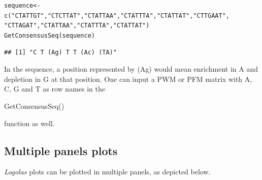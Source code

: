 \documentclass[12pt]{article}\usepackage[]{graphicx}\usepackage[usenames,dvipsnames]{color}
\newcommand{\hlstr}[1]{\textcolor[rgb]{0.251,0.627,0.251}{#1}}%
\newcommand{\hlstd}[1]{\textcolor[rgb]{0.251,0.251,0.251}{#1}}%
\newcommand{\hlkwb}[1]{\textcolor[rgb]{0,0,0}{#1}}%
\newcommand{\hlkwd}[1]{\textcolor[rgb]{0.878,0.439,0.125}{#1}}%
\newenvironment{knitrout}{}{} %
\newcommand{\Logolas}{\textit{Logolas}}
\begin{document}
\begin{knitrout}
\color{fgcolor}\begin{kframe}
\begin{alltt}
\hlstd{sequence} \hlkwb{<-} \hlkwd{c}\hlstd{(}\hlstr{"CTATTGT"}\hlstd{,} \hlstr{"CTCTTAT"}\hlstd{,} \hlstr{"CTATTAA"}\hlstd{,} \hlstr{"CTATTTA"}\hlstd{,} \hlstr{"CTATTAT"}\hlstd{,} \hlstr{"CTTGAAT"}\hlstd{,}
              \hlstr{"CTTAGAT"}\hlstd{,} \hlstr{"CTATTAA"}\hlstd{,} \hlstr{"CTATTTA"}\hlstd{,} \hlstr{"CTATTAT"}\hlstd{)}
\hlkwd{GetConsensusSeq}\hlstd{(sequence)}
\end{alltt}
\begin{verbatim}
## [1] "C T (Ag) T T (Ac) (TA)"
\end{verbatim}
\end{kframe}
\end{knitrout}

In the sequence, a position represented by (Ag) would mean enrichment in A and depletion in G at that position.
One can input a PWM or PFM matrix with A, C, G and T as row names in the \begin{verb} GetConsensusSeq() \end{verb} function as well.

\subsection{Multiple panels plots}

\Logolas{} plots can be plotted in multiple panels, as depicted below.
\end{document}
